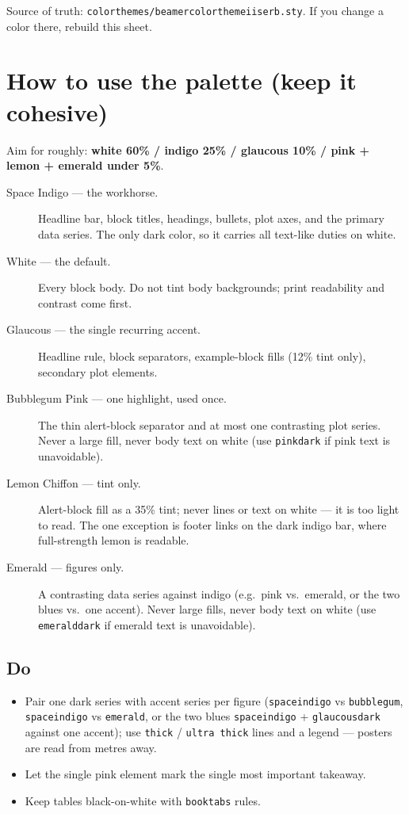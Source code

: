 \documentclass[a4paper,11pt]{article}
\begin{document}
\vfill
{\small Source of truth: \texttt{colorthemes/beamercolorthemeiiserb.sty}. If you change a color there, rebuild this sheet.}

\newpage
\section*{How to use the palette (keep it cohesive)}
Aim for roughly: \textbf{white 60\% / indigo 25\% / glaucous 10\% / pink + lemon + emerald under 5\%}.

\begin{description}
\item[Space Indigo — the workhorse.] Headline bar, block titles, headings,
bullets, plot axes, and the primary data series. The only dark color, so it
carries all text-like duties on white.
\item[White — the default.] Every block body. Do not tint body backgrounds;
print readability and contrast come first.
\item[Glaucous — the single recurring accent.] Headline rule, block
separators, example-block fills (12\% tint only), secondary plot elements.
\item[Bubblegum Pink — one highlight, used once.] The thin alert-block
separator and at most one contrasting plot series. Never a large fill, never
body text on white (use \texttt{pinkdark} if pink text is unavoidable).
\item[Lemon Chiffon — tint only.] Alert-block fill as a 35\% tint; never
lines or text on white — it is too light to read. The one exception is
footer links on the dark indigo bar, where full-strength lemon is readable.
\item[Emerald — figures only.] A contrasting data series against indigo
(e.g.\ pink vs.\ emerald, or the two blues vs.\ one accent). Never large
fills, never body text on white (use \texttt{emeralddark} if emerald text is
unavoidable).
\end{description}

\subsection*{Do}
\begin{itemize}
\item Pair one dark series with accent series per figure
(\texttt{spaceindigo} vs \texttt{bubblegum}, \texttt{spaceindigo} vs
\texttt{emerald}, or the two blues \texttt{spaceindigo} + \texttt{glaucousdark}
against one accent); use \texttt{thick} / \texttt{ultra thick} lines and a
legend — posters are read from metres away.
\item Let the single pink element mark the single most important takeaway.
\item Keep tables black-on-white with \texttt{booktabs} rules.
\end{itemize}
\end{document}

